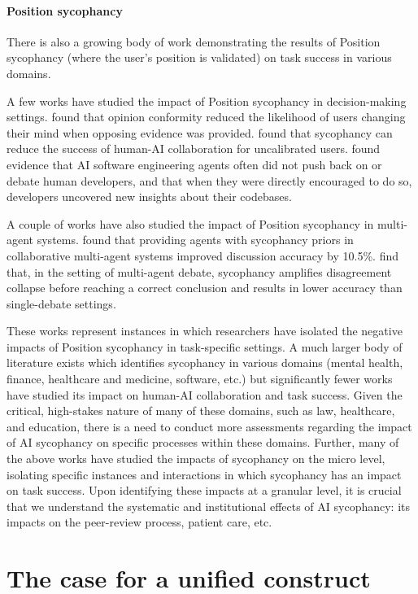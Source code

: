 \paragraph{Position sycophancy}
There is also a growing body of work demonstrating the results of Position sycophancy (where the user's position is validated) on task success in various domains.

A few works have studied the impact of Position sycophancy in decision-making settings. \cite{li2026does} found that opinion conformity reduced the likelihood of users changing their mind when opposing evidence was provided. \citet{sicilia-etal-2025-accounting} found that sycophancy can reduce the success of human-AI collaboration for uncalibrated users. \citet{kumar2025ai} found evidence that AI software engineering agents often did not push back on or debate human developers, and that when they were directly encouraged to do so, developers uncovered new insights about their codebases. 

A couple of works have also studied the impact of Position sycophancy in multi-agent systems. \citet{kasprova2026too} found that providing agents with sycophancy priors in collaborative multi-agent systems improved discussion accuracy by 10.5\%. \citet{Yao2025PeacemakerOT} find that, in the setting of multi-agent debate, sycophancy amplifies disagreement collapse before reaching a correct conclusion and results in lower accuracy than single-debate settings. 

These works represent instances in which researchers have isolated the negative impacts of Position sycophancy in task-specific settings. A much larger body of literature exists which identifies sycophancy in various domains (mental health, finance, healthcare and medicine, software, etc.) but significantly fewer works have studied its impact on human-AI collaboration and task success. Given the critical, high-stakes nature of many of these domains, such as law, healthcare, and education, there is a need to conduct more assessments regarding the impact of AI sycophancy on specific processes within these domains. Further, many of the above works have studied the impacts of sycophancy on the micro level, isolating specific instances and interactions in which sycophancy has an impact on task success. Upon identifying these impacts at a granular level, it is crucial that we understand the systematic and institutional effects of AI sycophancy: its impacts on the peer-review process, patient care, etc.

\section{The case for a unified construct}

